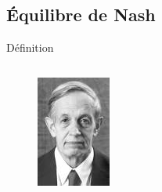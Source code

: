 \subsection{Équilibre de Nash}
\begin{frame}{Définition}
\centering
\vspace{-20pt}
\begin{columns}
	\begin{column}{0.3\textwidth}
		\begin{figure}
			\centering
			\includegraphics[width=\linewidth]{resources/nash}
		\end{figure}
		

\end{column}
\end{columns}
\end{frame}
